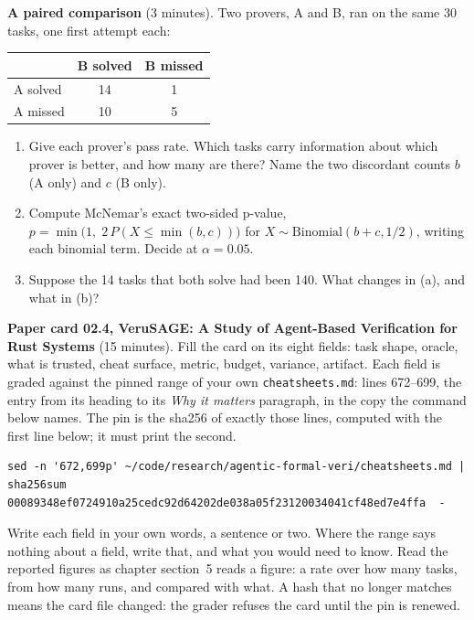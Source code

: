 \documentclass[11pt]{article}
\begin{document}
\begin{problem}\label{prob:B4}
\textbf{A paired comparison} (3 minutes). Two provers, A and B, ran on the same
30 tasks, one first attempt each:
\begin{center}
\begin{tabular}{lcc}
 & B solved & B missed \\ \hline
A solved & 14 & 1 \\
A missed & 10 & 5
\end{tabular}
\end{center}
\begin{enumerate}
\item[(a)] Give each prover's pass rate. Which tasks carry information about
  which prover is better, and how many are there? Name the two discordant
  counts $b$ (A only) and $c$ (B only).
\item[(b)] Compute McNemar's exact two-sided p-value,
  $p = \min\bigl(1,\; 2\,P(X \leq \min(b, c))\bigr)$ for
  $X \sim \mathrm{Binomial}(b + c, 1/2)$, writing each binomial term. Decide at
  $\alpha = 0.05$.
\item[(c)] Suppose the 14 tasks that both solve had been 140. What changes in
  (a), and what in (b)?
\end{enumerate}
\end{problem}

\begin{problem}\label{prob:B5}
\textbf{Paper card 02.4, VeruSAGE: A Study of Agent-Based Verification for Rust
Systems} (15 minutes). Fill the card on its eight fields: task shape, oracle,
what is trusted, cheat surface, metric, budget, variance, artifact. Each field
is graded against the pinned range of your own \texttt{cheatsheets.md}: lines
672--699, the entry from its heading to its \emph{Why it matters} paragraph, in
the copy the command below names. The pin is the sha256 of exactly those lines,
computed with the first line below; it must print the second.
{\small
\begin{verbatim}
sed -n '672,699p' ~/code/research/agentic-formal-veri/cheatsheets.md | sha256sum
00089348ef0724910a25cedc92d64202de038a05f23120034041cf48ed7e4ffa  -
\end{verbatim}
}
Write each field in your own words, a sentence or two. Where the range says
nothing about a field, write that, and what you would need to know. Read the
reported figures as chapter section~5 reads a figure: a rate over how many
tasks, from how many runs, and compared with what. A hash that no longer
matches means the card file changed: the grader refuses the card until the pin
is renewed.
\end{problem}
\end{document}
